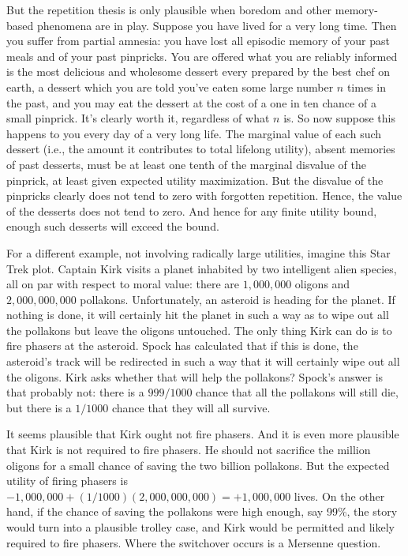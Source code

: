 But the repetition thesis is only plausible when boredom and other memory-based phenomena are in play. Suppose you have 
lived for a very long time. Then you suffer from partial amnesia: you have
lost all episodic memory of your past meals and of your past pinpricks. You are offered what you are reliably informed is 
the most delicious and wholesome dessert every prepared by the best chef on earth, a dessert  which you are told you've eaten some large 
number $n$ times in the past, and you may eat the dessert at the cost of a one in ten chance of a small pinprick. It's clearly worth it,
regardless of what $n$ is. So now suppose this happens to you every day of a very long life. The marginal value of each such 
dessert (i.e., the amount it contributes to total lifelong utility), absent memories of past desserts, must  be at least one 
tenth of the marginal disvalue of the pinprick, at least given expected  utility maximization. But the disvalue of the pinpricks 
clearly does not tend to zero with forgotten repetition. Hence, the value of the desserts does not tend to zero. And hence for any
finite utility bound, enough such desserts will exceed the bound.

For a different example, not involving radically large utilities, imagine this Star Trek plot. Captain Kirk visits a planet inhabited
by two intelligent alien species, all on par with respect to moral value: there are $1,000,000$ oligons and 
$2,000,000,000$ pollakons. Unfortunately, an asteroid is heading for the planet. If nothing is done, it will certainly hit the planet in such
a way as to wipe out all the pollakons but leave the oligons untouched. The only thing Kirk can do is to fire phasers at the asteroid. Spock has calculated that if this
is done, the asteroid's track will be redirected in such a way that it will certainly wipe out all the oligons. Kirk asks whether that will help 
the pollakons? Spock's answer is that probably not: there is a $999/1000$ chance that all the pollakons will still die, but there is
a $1/1000$ chance that they will all survive. 

It seems plausible that Kirk ought not fire phasers. And it is even more plausible that Kirk is not required to fire phasers.
He should not sacrifice the million oligons for a small chance of saving the two billion pollakons. 
But the expected utility of firing phasers is $-1,000,000+(1/1000)(2,000,000,000)=+1,000,000$ lives.
On the other hand, if the chance of saving the pollakons were high enough, say 99\%, the story would turn into 
a plausible trolley case, and Kirk would be permitted and likely required to fire phasers. Where the switchover
occurs is a Mersenne question.

